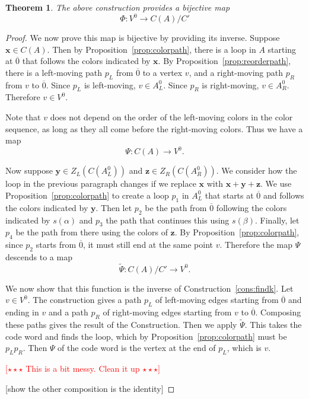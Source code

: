\documentclass[12pt,twoside,singlespace]{article}
\numberwithin{equation}{section}
\newtheorem{thm}[equation]{Theorem}
\theoremstyle{definition}
\newcommand{\com}[1]{\textcolor{red}{$[\star \star \star$ #1 $\star \star \star]$}}
\renewcommand{\vec}[1]{\mathbf{#1}}
\begin{document}
\begin{thm}
\label{thm:findk}
The above construction provides a bijective map
\[\Phi:V^0\to C(A)/C'\]
\end{thm}
\begin{proof}

We now prove this map is bijective by providing its inverse.  Suppose $\vec{x}\in C(A)$.  Then by Proposition~\ref{prop:colorpath}, there is a loop in $A$ starting at $\overline{0}$ that follows the colors indicated by $\vec{x}$.  By Proposition~\ref{prop:reorderpath}, there is a left-moving path $p_L$ from $\overline{0}$ to a vertex $v$, and a right-moving path $p_R$ from $v$ to $\overline{0}$.  Since $p_L$ is left-moving, $v\in A_L^0$.  Since $p_R$ is right-moving, $v\in A_R^0$.  Therefore $v\in V^0$.

Note that $v$ does not depend on the order of the left-moving colors in the color sequence, as long as they all come before the right-moving colors.  Thus we have a map
\[\Psi: C(A)  \to V^0.\]

Now suppose $\vec{y}\in Z_L(C(A_L^0))$ and $\vec{z}\in Z_R(C(A_R^0))$.  We consider how the loop in the previous paragraph changes if we replace $\vec{x}$ with $\vec{x}+\vec{y}+\vec{z}$.  We use Proposition~\ref{prop:colorpath} to create a loop $p_1$ in $A_L^0$ that starts at $\overline{0}$ and follows the colors indicated by $\vec{y}$.  Then let $p_2$ be the path from $\overline{0}$ following the colors indicated by $s(\alpha)$ and $p_3$ the path that continues this using $s(\beta)$.  Finally, let $p_4$ be the path from there using the colors of $\vec{z}$.  By Proposition~\ref{prop:colorpath}, since $p_2$ starts from $\overline{0}$, it must still end at the same point $v$.  Therefore the map $\Psi$ descends to a map
\[\tilde{\Psi}:C(A)/C' \to V^0.\]

We now show that this function is the inverse of Construction~\ref{cons:findk}.  Let $v\in V^0$.  The construction gives a path $p_L$ of left-moving edges starting from $\overline{0}$ and ending in $v$ and a path $p_R$ of right-moving edges starting from $v$ to $\overline{0}$.  Composing these paths gives the result of the Construction.  Then we apply $\tilde{\Psi}$.  This takes the code word and finds the loop, which by Proposition~\ref{prop:colorpath} must be $p_Lp_R$.  Then $\Psi$ of the code word is the vertex at the end of $p_L$, which is $v$.

\com{This is a bit messy.  Clean it up}

[show the other composition is the identity]

\end{proof}
\end{document}
